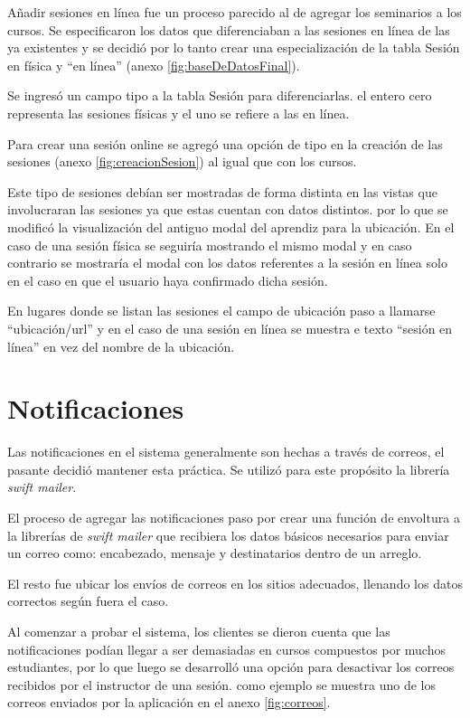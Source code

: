 	Añadir sesiones en línea fue un proceso parecido al de agregar los seminarios a los cursos. Se especificaron los datos que diferenciaban a las sesiones en línea de las ya existentes y se decidió por lo tanto crear una especialización de la tabla Sesión en física y ``en línea'' (anexo \ref{fig:baseDeDatosFinal}).

	Se ingresó un campo tipo a la tabla Sesión para diferenciarlas. el entero cero representa las sesiones físicas y el uno se refiere a las en línea.

	Para crear una sesión online se agregó una opción de tipo en la creación de las sesiones (anexo \ref{fig:creacionSesion}) al igual que con los cursos.

	Este tipo de sesiones debían ser mostradas de forma distinta en las vistas que involucraran las sesiones ya que estas cuentan con datos distintos. por lo que se modificó la visualización del antiguo modal del aprendiz para la ubicación. En el caso de una sesión física se seguiría mostrando el mismo modal y en caso contrario se mostraría el modal con los datos referentes a la sesión en línea solo en el caso en que el usuario haya confirmado dicha sesión.

	En lugares donde se listan las sesiones el campo de ubicación paso a llamarse ``ubicación/url'' y en el caso de una sesión en línea se muestra e texto ``sesión en línea'' en vez del nombre de la ubicación. 


	\section{Notificaciones} %
	\label{sec:notificaciones}
	
	Las notificaciones en el sistema generalmente son hechas a través de correos, el pasante decidió mantener esta práctica. Se utilizó para este propósito la librería \emph{swift mailer}.

	El proceso de agregar las notificaciones paso por crear una función de envoltura a la librerías de \emph{swift mailer} que recibiera los datos básicos necesarios para enviar un correo como: encabezado, mensaje y destinatarios dentro de un arreglo.

	El resto fue ubicar los envíos de correos en los sitios adecuados, llenando los datos correctos según fuera el caso.

	Al comenzar a probar el sistema, los clientes se dieron cuenta que las notificaciones podían llegar a ser demasiadas en cursos compuestos por muchos estudiantes, por lo que luego se desarrolló una opción para desactivar los correos recibidos por el instructor de una sesión. como ejemplo se muestra uno de los correos enviados por la aplicación en el anexo \ref{fig:correos}.


